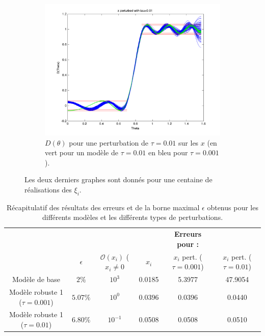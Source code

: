 \begin{figure}[h!]
\begin{subfigure}[b]{0.45\textwidth}
  \end{subfigure}
  \begin{subfigure}[b]{0.45\textwidth}
  \includegraphics[width=\textwidth]{D-ModRobust1-test3Rob01.png}
  \caption{$D(\theta)$ pour une perturbation de $\tau = 0.01$ sur les $x$ (en vert pour un modèle de $\tau=0.01$ en bleu pour $\tau=0.001$).}
  \label{fig:D-ModRobust1-test3RobTau01}
  \end{subfigure}
  \caption{Les deux derniers graphes sont donnés pour une centaine de réalisations des $\xi_i$.}
  \end{figure}

\begin{table}
\centering
\begin{tabular}{c|c|c|ccc}
 & & &  &\textbf{Erreurs pour : } &\\
 & $\epsilon$ & $\mathcal{O}( x_i)$ ($x_i\neq0$ &$x_i$ & $x_i$ pert. ($\tau=0.001$) & $x_i$ pert. ($\tau=0.01$) \\
 \hline
Modèle de base & $2\%$ & $10^3$ &0.0185 & 5.3977 & 47.9054 \\
Modèle robuste 1 ($\tau=0.001$) & $5.07 \%$ & $10^0$& 0.0396 & 0.0396  & 0.0440 \\
Modèle robuste 1 ($\tau=0.01$)  & $6.80 \%$ &$10^{-1}$ &0.0508 & 0.0508 & 0.0510 \\
\end{tabular}
\caption{Récapitulatif des résultats des erreurs et de la borne maximal $\epsilon$ obtenus pour les différents modèles et les différents types de perturbations.}
\label{table:Recap}
\end{table}